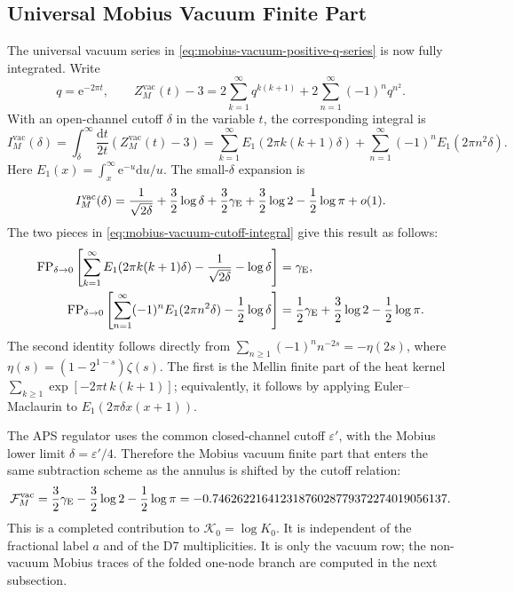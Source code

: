 \documentclass[11pt]{article}
\newcommand{\vac}{\mathrm{vac}}
\newcommand{\dd}{\mathrm{d}}
\newcommand{\e}{\mathrm{e}}
\newcommand{\eps}{\varepsilon}
\begin{document}
\subsection{Universal Mobius Vacuum Finite Part}

The universal vacuum series in \eqref{eq:mobius-vacuum-positive-q-series} is now fully
integrated.  Write
\begin{equation}
  q=\e^{-2\pi t},
  \qquad
  Z_M^{\vac}(t)-3
  =
  2\sum_{k=1}^{\infty}q^{k(k+1)}
  +
  2\sum_{n=1}^{\infty}(-1)^nq^{n^2}.
  \label{eq:mobius-vacuum-positive-series-paired}
\end{equation}
With an open-channel cutoff \(\delta\) in the variable \(t\), the corresponding integral is
\begin{equation}
  I_M^{\vac}(\delta)
  =
  \int_\delta^\infty\frac{\dd t}{2t}\left(Z_M^{\vac}(t)-3\right)
  =
  \sum_{k=1}^{\infty}E_1(2\pi k(k+1)\delta)
  +
  \sum_{n=1}^{\infty}(-1)^nE_1(2\pi n^2\delta).
  \label{eq:mobius-vacuum-cutoff-integral}
\end{equation}
Here \(E_1(x)=\int_x^\infty\e^{-u}\dd u/u\).  The small-\(\delta\) expansion is
\begin{equation}
  I_M^{\vac}(\delta)
  =
  \frac{1}{\sqrt{2\delta}}
  +\frac32\log\delta
  +
  \frac32\gamma_{\rm E}
  +\frac32\log2
  -\frac12\log\pi
  +o(1).
  \label{eq:mobius-vacuum-t-cutoff-finite}
\end{equation}
The two pieces in \eqref{eq:mobius-vacuum-cutoff-integral} give this result as follows:
\begin{align}
  \operatorname{FP}_{\delta\to0}
  \left[
    \sum_{k=1}^{\infty}E_1(2\pi k(k+1)\delta)
    -\frac{1}{\sqrt{2\delta}}
    -\log\delta
  \right]
  &=
  \gamma_{\rm E},
  \label{eq:mobius-vacuum-triangular-finite}
  \\
  \operatorname{FP}_{\delta\to0}
  \left[
    \sum_{n=1}^{\infty}(-1)^nE_1(2\pi n^2\delta)
    -\frac12\log\delta
  \right]
  &=
  \frac12\gamma_{\rm E}
  +\frac32\log2
  -\frac12\log\pi .
  \label{eq:mobius-vacuum-alternating-finite}
\end{align}
The second identity follows directly from
\(\sum_{n\ge1}(-1)^n n^{-2s}=-\eta(2s)\), where
\(\eta(s)=(1-2^{1-s})\zeta(s)\).  The first is the Mellin finite part of the heat kernel
\(\sum_{k\ge1}\exp[-2\pi t\,k(k+1)]\); equivalently, it follows by applying Euler--Maclaurin
to \(E_1(2\pi\delta x(x+1))\).

The APS regulator uses the common closed-channel cutoff \(\eps'\), with the Mobius lower limit
\(\delta=\eps'/4\).  Therefore the Mobius vacuum finite part that enters the same subtraction
scheme as the annulus is shifted by the cutoff relation:
\begin{equation}
  \mathcal F_M^{\vac}
  =
  \frac32\gamma_{\rm E}
  -\frac32\log2
  -\frac12\log\pi
  =
  -0.74626221641231876028779372274019056137 .
  \label{eq:mobius-vacuum-aps-finite-part}
\end{equation}
This is a completed contribution to \(\mathcal K_0=\log K_0\).  It is independent of the
fractional label \(a\) and of the D7 multiplicities.  It is only the vacuum row; the non-vacuum
Mobius traces of the folded one-node branch are computed in the next subsection.
\end{document}
